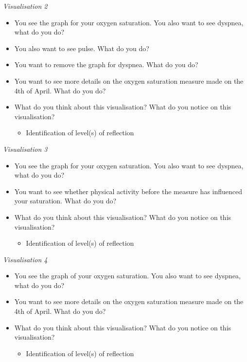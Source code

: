 \textit{\small Visualisation 2}
\begin{itemize}
\item You see the graph for your oxygen saturation. You also want to see dyspnea, what do you do?
\item You also want to see pulse. What do you do?
\item You want to remove the graph for dyspnea. What do you do?
\item You want to see more details on the oxygen saturation measure made on the 4th of April. What do you do?
\item What do you think about this visualisation? What do you notice on this visualisation?
\begin{itemize}
	\item Identification of level(s) of reflection
	\end{itemize}
\end{itemize}

\textit{\small Visualisation 3}
\begin{itemize}
\item You see the graph for your oxygen saturation. You also want to see dyspnea, what do you do?
\item You want to see whether physical activity before the measure has influenced your saturation. What do you do? 
\item What do you think about this visualisation? What do you notice on this visualisation?
\begin{itemize}
	\item Identification of level(s) of reflection
	\end{itemize}
\end{itemize}

\textit{\small Visualisation 4}
\begin{itemize}
\item You see the graph of your oxygen saturation. You also want to see dyspnea, what do you do?
\item You want to see more details on the oxygen saturation measure made on the 4th of April. What do you do?
\item What do you think about this visualisation? What do you notice on this visualisation?
\begin{itemize}
	\item Identification of level(s) of reflection
	\end{itemize}
\end{itemize}

